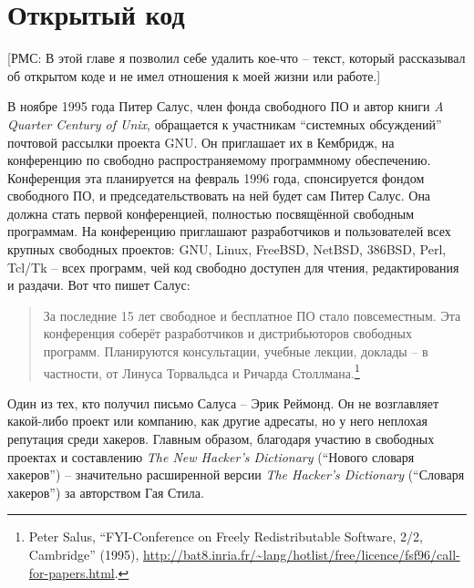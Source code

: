 

\chapter{Открытый код} \label{chapter:open source}

[РМС: В этой главе я позволил себе удалить кое-что -- текст, который рассказывал об открытом коде и не имел отношения к моей жизни или работе.]

В ноябре 1995 года Питер Салус, член фонда свободного ПО и автор книги \textit{A Quarter Century of Unix}, обращается к участникам \enquote{системных обсуждений} почтовой рассылки проекта GNU. Он приглашает их в Кембридж, на конференцию по свободно распространяемому программному обеспечению. Конференция эта планируется на февраль 1996 года, спонсируется фондом свободного ПО, и председательствовать на ней будет сам Питер Салус. Она должна стать первой конференцией, полностью посвящённой свободным программам. На конференцию приглашают разработчиков и пользователей всех крупных свободных проектов: GNU, Linux, FreeBSD, NetBSD, 386BSD, Perl, Tcl/Tk -- всех программ, чей код свободно доступен для чтения, редактирования и раздачи. Вот что пишет Салус:

\begin{quote}
За последние 15 лет свободное и бесплатное ПО стало повсеместным. Эта конференция соберёт разработчиков и дистрибьюторов свободных программ. Планируются консультации, учебные лекции, доклады -- в частности, от Линуса Торвальдса и Ричарда Столлмана.\footnote{Peter Salus, \enquote{FYI-Conference on Freely Redistributable Software, 2/2, Cambridge} (1995), \url{http://bat8.inria.fr/~lang/hotlist/free/licence/fsf96/call-for-papers.html}.}
\end{quote}

Один из тех, кто получил письмо Салуса -- Эрик Реймонд. Он не возглавляет какой-либо проект или компанию, как другие адресаты, но у него неплохая репутация среди хакеров. Главным образом, благодаря участию в свободных проектах и составлению \textit{The New Hacker's Dictionary} (\enquote{Нового словаря хакеров})  -- значительно расширенной версии \textit{The Hacker's Dictionary} (\enquote{Словаря хакеров}) за авторством Гая Стила.

